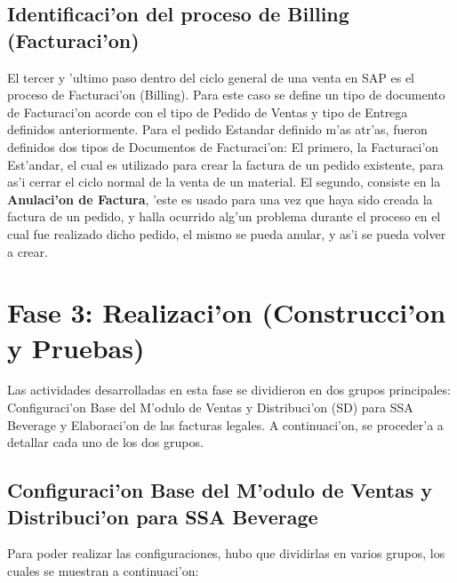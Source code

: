 \subsection{Identificaci'on del proceso de Billing (Facturaci'on)}
	El tercer y 'ultimo paso dentro del ciclo general de una venta en SAP es el proceso de Facturaci'on (Billing). Para este caso se define un tipo de documento de Facturaci'on acorde con el tipo de Pedido de Ventas y tipo de Entrega definidos anteriormente.
	Para el pedido Estandar definido m'as atr'as, fueron definidos dos tipos de Documentos de Facturaci'on: El primero, la Facturaci'on Est'andar, el cual es utilizado para crear la factura de un pedido existente, para as'i cerrar el ciclo normal de la venta de un material. El segundo, consiste en la \textbf{Anulaci'on de Factura}, 'este es usado para una vez que haya sido creada la factura de un pedido, y halla ocurrido alg'un problema durante el proceso en el cual fue realizado dicho pedido, el mismo se pueda anular, y as'i se pueda volver a crear.

\section{Fase 3: Realizaci'on (Construcci'on y Pruebas)}
	Las actividades desarrolladas en esta fase se dividieron en dos grupos principales: Configuraci'on Base del M'odulo de Ventas y Distribuci'on (SD) para SSA Beverage y Elaboraci'on de las facturas legales.
	A continuaci'on, se proceder'a a detallar cada uno de los dos grupos.
\subsection{Configuraci'on Base del M'odulo de Ventas y Distribuci'on para SSA Beverage}
	Para poder realizar las configuraciones, hubo que dividirlas en varios grupos, los cuales se muestran a continuaci'on:
